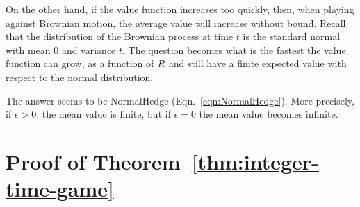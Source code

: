 \documentclass[12pt]{article} %
\begin{document}
On the other hand, if the value function increases too quickly, then,
when playing against Brownian motion, the average value will increase
without bound.  Recall that the distribution of the Brownian process
at time $t$ is the standard normal with mean 0 and variance $t$.
The question becomes what is the fastest the value
function can grow, as a function of $R$ and still have a finite
expected value with respect to the normal distribution.

The answer seems to be NormalHedge (Eqn.~\ref{eqn:NormalHedge}). More
precisely, if $\epsilon>0$, the mean value is finite, but if
$\epsilon=0$ the mean value becomes infinite.


\appendix


\section{Proof of Theorem~\ref{thm:integer-time-game}}
\label{proof:integer-time-game}
\end{document}

